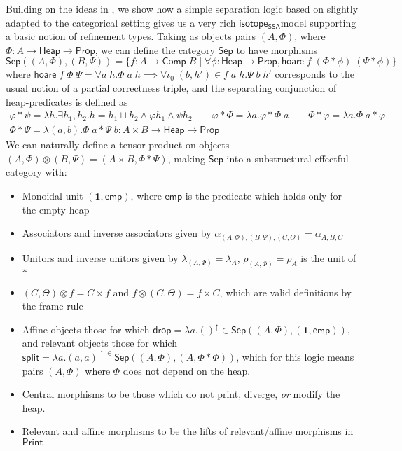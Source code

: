 \documentclass[acmsmall,screen,review]{acmart}
\newcommand{\mb}[1]{\ensuremath{\mathbf{#1}}}
\newcommand{\ms}[1]{\ensuremath{\mathsf{#1}}}
\newcommand{\upg}[2]{{#1}^{\uparrow #2}}
\newcommand{\isotopessa}{\ms{isotope_{SSA}}}
\begin{document}
Building on the ideas in \citet{mellies-ftrs}, we show how a simple separation
logic based on \citet{reynolds-separation-2002} slightly adapted to the
categorical setting gives us a very rich \isotopessa model supporting a basic
notion of refinement types. Taking as objects pairs \((A, \Phi)\), where \(\Phi: A \to
\ms{Heap} \to \ms{Prop}\), we can define the category \(\ms{Sep}\) to have
morphisms
\begin{equation}
  \ms{Sep}((A, \Phi), (B, \Psi)) = \{f: A \to \ms{Comp}\;B 
    \mid \forall \phi: \ms{Heap} \to \ms{Prop}, \ms{hoare}\;f\;(\Phi \ast \phi)\;(\Psi \ast \phi)\}
\end{equation}
where
\(
  \ms{hoare}\;f\;\Phi\;\Psi = \forall a\;h. \Phi\;a\;h \implies \forall \iota_0\;(b, h') \in f\;a\;h. \Psi\;b\;h'
\)
corresponds to the usual notion of a partial correctness triple, and the
separating conjunction of heap-predicates is defined as
\begin{equation}
  \begin{gathered}
  \varphi \ast \psi = \lambda h. \exists h_1, h_2. h = h_1 \sqcup h_2 \land \varphi h_1 \land \psi h_2 
  \qquad
  \varphi \ast \Phi = \lambda a. \varphi \ast \Phi\;a
  \qquad
  \Phi \ast \varphi = \lambda a. \Phi\;a \ast \varphi \\
  \Phi \ast \Psi = \lambda (a, b). \Phi\;a \ast \Psi\;b: A \times B \to \ms{Heap} \to \ms{Prop}
  \end{gathered}
\end{equation}
We can naturally define a tensor product on objects \((A, \Phi) \otimes (B,
\Psi) = (A \times B, \Phi \ast \Psi)\), making \(\ms{Sep}\) into a substructural
effectful category with:
\begin{itemize}
  \item Monoidal unit \((\mb{1}, \ms{emp})\), where \(\ms{emp}\) is the
  predicate which holds only for the empty heap
  \item Associators and inverse associators given by \(\alpha_{(A, \Phi), (B,
  \Psi), (C, \Theta)} = \alpha_{A, B, C}\)
  \item Unitors and inverse unitors given by \(\lambda_{(A, \Phi)} =
  \lambda_A\), \(\rho_{(A, \Phi)} = \rho_A\)
  is the unit of \(\ast\)
  \item \((C, \Theta) \otimes f = C \times f\) and \(f \otimes (C, \Theta) = f
  \times C\), which are valid definitions by the frame rule
  \item Affine objects those for which \(\ms{drop} = \upg{\lambda a. ()}{} \in
  \ms{Sep}((A, \Phi), (\mb{1}, \ms{emp}))\), and relevant objects those for
  which \(\ms{split} = \upg{\lambda a. (a, a)} \in \ms{Sep}((A, \Phi), (A, \Phi
  * \Phi))\), which for this logic means pairs \((A, \Phi)\) where \(\Phi\) does
  not depend on the heap.
  \item Central morphisms to be those which do not print, diverge, \textit{or}
  modify the heap. %
  \item Relevant and affine morphisms to be the lifts of relevant/affine
  morphisms in \(\ms{Print}\)
\end{itemize}
\end{document}

